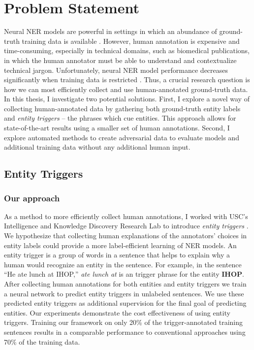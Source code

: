 \section{Problem Statement}
Neural NER models are powerful in settings in which an abundance of ground-truth training data is available \citep{LampleNER}. However, human annotation is expensive and time-consuming, especially in technical domains, such as biomedical publications, in which the human annotator must be able to understand and contextualize technical jargon. Unfortunately, neural NER model performance decreases significantly when training data is restricted \citep{TriggerNER}. Thus, a crucial research question is how we can most efficiently collect and use human-annotated ground-truth data. In this thesis, I investigate two potential solutions. First, I explore a novel way of collecting human-annotated data by gathering both ground-truth entity labels and \textit{entity triggers} -- the phrases which cue entities. This approach allows for state-of-the-art results using a smaller set of human annotations. Second, I explore automated methods to create adversarial data to evaluate models and additional training data without any additional human input.

\subsection{Entity Triggers}
\subsubsection{Our approach}
As a method to more efficiently collect human annotations, I worked with USC's Intelligence and Knowledge Discovery Research Lab to introduce \textit{entity triggers} \citep{TriggerNER}. We hypothesize that collecting human explanations of the annotators' choices in entity labels could provide a more label-efficient learning of NER models. An entity trigger is a group of words in a sentence that helps to explain why a human would recognize an entity in the sentence. For example, in the sentence ``He ate lunch at IHOP,'' \textit{ate lunch at} is an trigger phrase for the entity \textbf{IHOP}. After collecting human annotations for both entities and entity triggers we train a neural network to predict entity triggers in unlabeled sentences. We use these predicted entity triggers as additional supervision for the final goal of predicting entities. Our experiments demonstrate the cost effectiveness of using entity triggers. Training our framework on only 20\% of the trigger-annotated training sentences results in a comparable performance to conventional approaches using 70\% of the training data.

